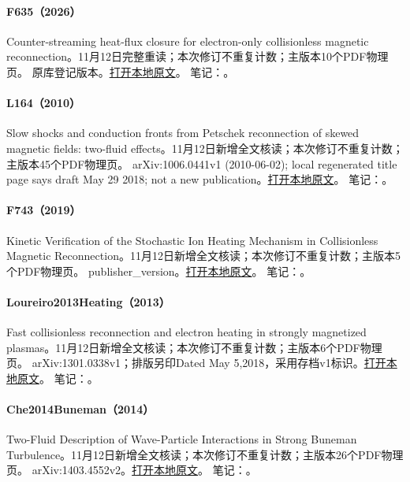 \paragraph{F635（2026）}\label{paper:F635}
Counter-streaming heat-flux closure for electron-only collisionless magnetic reconnection。11月12日完整重读；本次修订不重复计数；主版本10个PDF物理页。
原库登记版本。\href{run:../../papers/F635.pdf}{打开本地原文}。
笔记：。\par\smallskip
\paragraph{L164（2010）}\label{paper:L164}
Slow shocks and conduction fronts from Petschek reconnection of skewed magnetic fields: two-fluid effects。11月12日新增全文核读；本次修订不重复计数；主版本45个PDF物理页。
arXiv:1006.0441v1 (2010-06-02); local regenerated title page says draft May 29 2018; not a new publication。\href{run:../../papers/L164.pdf}{打开本地原文}。
笔记：。\par\smallskip
\paragraph{F743（2019）}\label{paper:F743}
Kinetic Verification of the Stochastic Ion Heating Mechanism in Collisionless Magnetic Reconnection。11月12日新增全文核读；本次修订不重复计数；主版本5个PDF物理页。
publisher\_version。\href{run:../../papers/F743.pdf}{打开本地原文}。
笔记：。\par\smallskip
\paragraph{Loureiro2013Heating（2013）}\label{paper:Loureiro2013Heating}
Fast collisionless reconnection and electron heating in strongly magnetized plasmas。11月12日新增全文核读；本次修订不重复计数；主版本6个PDF物理页。
arXiv:1301.0338v1；排版另印Dated May 5,2018，采用存档v1标识。\href{run:../../papers/Loureiro2013Heating.pdf}{打开本地原文}。
笔记：。\par\smallskip
\paragraph{Che2014Buneman（2014）}\label{paper:Che2014Buneman}
Two-Fluid Description of Wave-Particle Interactions in Strong Buneman Turbulence。11月12日新增全文核读；本次修订不重复计数；主版本26个PDF物理页。
arXiv:1403.4552v2。\href{run:../../papers/Che2014Buneman.pdf}{打开本地原文}。
笔记：。\par\smallskip
